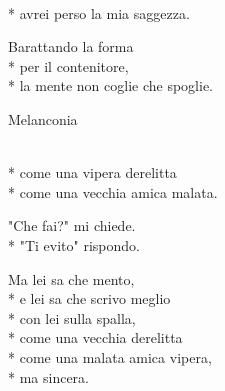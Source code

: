 \documentclass[12pt]{book}
\begin{document}
\begin{poem}{}{}

\settowidth{\versewidth}{non meno è ciò che meriti.}


\begin{altverse}
\\*
avrei perso la mia saggezza.
\end{altverse}

\begin{altverse}
Barattando la forma \\*
per il contenitore, \\*
la mente non coglie che spoglie.
\end{altverse}


\end{poem}

\begin{poem}{Melanconia}{}

\settowidth{\versewidth}{non meno è ciò che meriti.}


\begin{altverse}
\\*
come una vipera derelitta\\*
come una vecchia amica malata.
\end{altverse}

\begin{altverse}
"Che fai?" mi chiede.\\*
"Ti evito" rispondo.
\end{altverse}

\begin{altverse}
Ma lei sa che mento,\\*
e lei sa che scrivo meglio\\*
con lei sulla spalla,\\*
come una vecchia derelitta\\*
come una malata amica vipera,\\*
ma sincera.
\end{altverse}


\end{poem}
\end{document}
